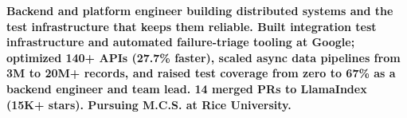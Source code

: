 \item\small{\textbf{Backend and platform engineer building distributed systems and the test infrastructure that keeps them reliable. Built integration test infrastructure and automated failure-triage tooling at \textbf{Google}; optimized \textbf{140+} APIs (\textbf{27.7\%} faster), scaled async data pipelines from 3M to \textbf{20M+} records, and raised test coverage from zero to \textbf{67\%} as a backend engineer and team lead. \textbf{14} merged PRs to \textbf{LlamaIndex} (15K+ stars). Pursuing M.C.S. at Rice University.}}%
